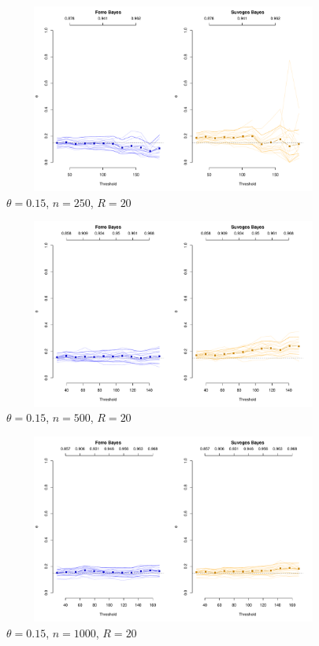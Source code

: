 \documentclass[12pt]{article}
\begin{document}
\newpage

\begin{figure}
\begin{center}
\includegraphics[width=5.5in, height=2.45in]{../extremal_comparison/figs/sim_frechet_hier_15_250_20.pdf}
\caption{$\theta=0.15$, $n=250$, $R=20$}
\end{center}
\end{figure}

\begin{figure}
\begin{center}
\includegraphics[width=5.5in, height=2.45in]{../extremal_comparison/figs/sim_frechet_hier_15_500_20.pdf}
\caption{$\theta=0.15$, $n=500$, $R=20$}
\end{center}
\end{figure}

\begin{figure}
\begin{center}
\includegraphics[width=5.5in, height=2.45in]{../extremal_comparison/figs/sim_frechet_hier_15_1000_20.pdf}
\caption{$\theta=0.15$, $n=1000$, $R=20$}
\end{center}
\end{figure}
\end{document}
